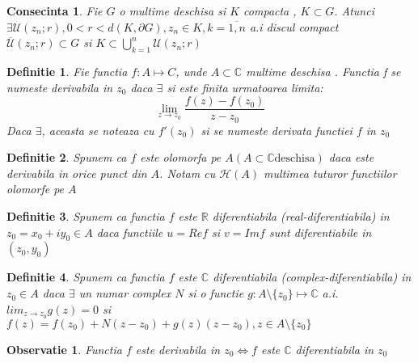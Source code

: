 \documentclass[10pt,a4paper]{article}
\newtheorem{definition}{Definitie}
\newtheorem{observation}{Observatie}
\newtheorem{consequence}{Consecinta}
\newcommand{\R}{\ensuremath{\mathbb{R}}}
\newcommand{\C}{\ensuremath{\mathbb{C}}}
\begin{document}
\begin{consequence}
	Fie $G$ o multime deschisa si $K$ compacta , $K\subset G$.
	Atunci $\exists \mathcal{U}(z_n;r), 0 < r < d(K, \partial G) ,
	z_n \in K , k = \overline{1,n}$ a.i discul compact
	$\overline{\mathcal{U}}(z_n;r) \subset G$ si $K \subset \bigcup_{k=1}^{n} \mathcal{U}(z_n;r)$
\end{consequence}

\begin{definition}
	Fie functia $f:A \mapsto C$, unde $A\subset\C$ multime deschisa . Functia f
	se numeste derivabila in $z_0$ daca $\exists$ si este finita urmatoarea
	limita:
	\begin{equation}
		\lim_{z\to z_0} \frac{f(z)-f(z_0)}{z-z_0}
	\end{equation}
	Daca $\exists$, aceasta se noteaza cu $f'(z_0)$ si se numeste derivata
	functiei $f$ in $z_0$
\end{definition}

\begin{definition}
	Spunem ca $f$ este olomorfa pe $A (A\subset\C\text{deschisa})$ daca este
	derivabila in orice punct din $A$.
	Notam cu $\mathcal{H}(A)$ multimea tuturor functiilor olomorfe pe $A$
\end{definition}

\begin{definition}
	Spunem ca functia $f$ este $\R$ diferentiabila (real-diferentiabila)
	in $z_0 = x_0 + iy_0 \in A$ daca functiile $u=Re f$ si $v = Im f $ sunt
	diferentiabile in $(z_0, y_0)$
\end{definition}

\begin{definition}
	Spunem ca functia $f$ este $\C$ diferentiabila (complex-diferentiabila)
	in $z_0 \in A$ daca $\exists$ un numar complex $N$ si o functie
	$g:A\setminus \{z_0\} \mapsto \C$ a.i. $lim_{z\to z_0} g(z) = 0 $ si
	$f(z) = f(z_0) + N(z-z_0) + g(z)(z-z_0) , z \in A\setminus \{z_0\}$
\end{definition}

\begin{observation}
	Functia $f$ este derivabila in $z_0 \iff f$ este $\C$ diferentiabila in $z_0$
\end{observation}
\end{document}
